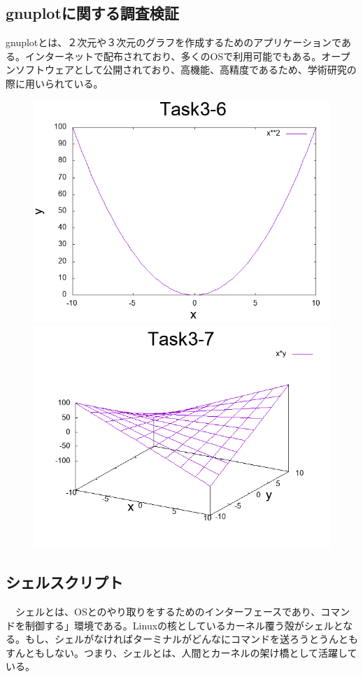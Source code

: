 \documentclass[a4paper,11pt,titlepage]{jarticle}
\begin{document}
\subsection{gnuplotに関する調査検証}
 gnuplotとは、２次元や３次元のグラフを作成するためのアプリケーションである。インターネットで配布されており、多くのOSで利用可能でもある。オープンソフトウェアとして公開されており、高機能、高精度であるため、学術研究の際に用いられている。
 \begin{figure}[htbp]
	\centering
	\includegraphics[width=125mm]{task3_6.png}
	\label{task3_6}\\
	\includegraphics[width=125mm]{task3_7.png}
	\label{task3_7}\\
\end{figure}
\subsection{シェルスクリプト}
　シェルとは、OSとのやり取りをするためのインターフェースであり、コマンドを制御する」環境である。Linuxの核としているカーネル覆う殻がシェルとなる。もし、シェルがなければターミナルがどんなにコマンドを送ろうとうんともすんともしない。つまり、シェルとは、人間とカーネルの架け橋として活躍している。
\end{document}
